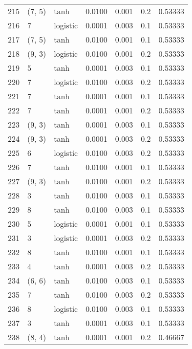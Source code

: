 \begin{tabular}{lllrrrr}
215 &      (7, 5) &      tanh &  0.0100 &  0.001 &  0.2 &   0.53333 \\
216 &           7 &  logistic &  0.0001 &  0.003 &  0.1 &   0.53333 \\
217 &      (7, 5) &      tanh &  0.0100 &  0.001 &  0.1 &   0.53333 \\
218 &      (9, 3) &  logistic &  0.0100 &  0.001 &  0.2 &   0.53333 \\
219 &           5 &      tanh &  0.0001 &  0.003 &  0.1 &   0.53333 \\
220 &           7 &  logistic &  0.0100 &  0.003 &  0.2 &   0.53333 \\
221 &           7 &      tanh &  0.0001 &  0.001 &  0.1 &   0.53333 \\
222 &           7 &      tanh &  0.0001 &  0.001 &  0.2 &   0.53333 \\
223 &      (9, 3) &      tanh &  0.0001 &  0.003 &  0.1 &   0.53333 \\
224 &      (9, 3) &      tanh &  0.0001 &  0.003 &  0.2 &   0.53333 \\
225 &           6 &  logistic &  0.0100 &  0.003 &  0.2 &   0.53333 \\
226 &           7 &      tanh &  0.0100 &  0.001 &  0.1 &   0.53333 \\
227 &      (9, 3) &      tanh &  0.0100 &  0.001 &  0.2 &   0.53333 \\
228 &           3 &      tanh &  0.0100 &  0.003 &  0.1 &   0.53333 \\
229 &           8 &      tanh &  0.0100 &  0.003 &  0.1 &   0.53333 \\
230 &           5 &  logistic &  0.0001 &  0.001 &  0.1 &   0.53333 \\
231 &           3 &  logistic &  0.0001 &  0.003 &  0.2 &   0.53333 \\
232 &           8 &      tanh &  0.0100 &  0.001 &  0.1 &   0.53333 \\
233 &           4 &      tanh &  0.0001 &  0.003 &  0.2 &   0.53333 \\
234 &      (6, 6) &      tanh &  0.0100 &  0.003 &  0.1 &   0.53333 \\
235 &           7 &      tanh &  0.0100 &  0.003 &  0.2 &   0.53333 \\
236 &           8 &  logistic &  0.0100 &  0.003 &  0.1 &   0.53333 \\
237 &           3 &      tanh &  0.0001 &  0.003 &  0.1 &   0.53333 \\
238 &      (8, 4) &      tanh &  0.0001 &  0.001 &  0.2 &   0.46667 \\

\end{tabular}
